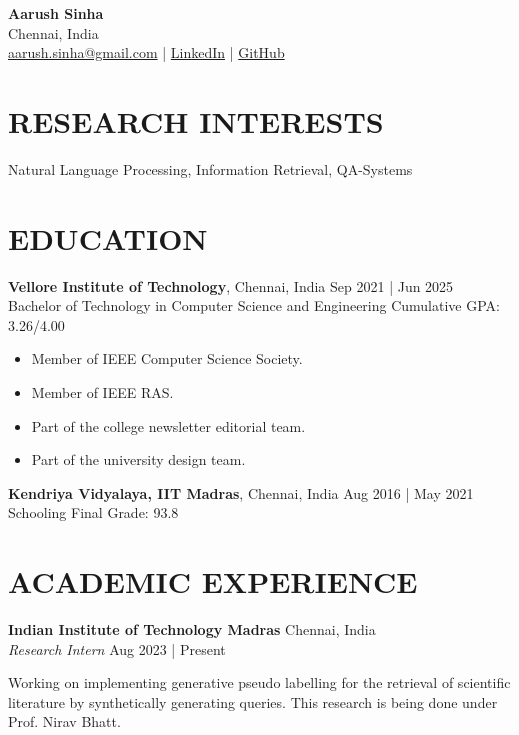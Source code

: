 \documentclass[a4paper,9pt]{extarticle}
\begin{document}
\begin{flushleft}
    \textbf{\LARGE Aarush Sinha}\\[2pt] %
    Chennai, India \\
    \href{mailto:aarush.sinha@gmail.com}{aarush.sinha@gmail.com} | \href{https://www.linkedin.com/in/asj10/}{LinkedIn} | \href{https://github.com/chungimungi}{GitHub} %
\end{flushleft}

\section*{RESEARCH INTERESTS}
\noindent
Natural Language Processing, Information Retrieval, QA-Systems

\section*{EDUCATION}
\noindent
\textbf{Vellore Institute of Technology}, Chennai, India \hfill Sep 2021 | Jun 2025\\ %
Bachelor of Technology in Computer Science and Engineering \hfill Cumulative GPA: 3.26/4.00 \\
\begin{itemize}
    \item Member of IEEE Computer Science Society.
    \item Member of IEEE RAS.
    \item Part of the college newsletter editorial team.
    \item Part of the university design team.
\end{itemize}

\noindent
\textbf{Kendriya Vidyalaya, IIT Madras}, Chennai, India \hfill Aug 2016 | May 2021\\ %
Schooling \hfill Final Grade: 93.8 %

\section*{ACADEMIC EXPERIENCE}
\noindent
\textbf{Indian Institute of Technology Madras} \hfill Chennai, India\\ %
\textit{Research Intern} \hfill Aug 2023 | Present %

Working on implementing generative pseudo labelling for the retrieval of scientific literature by synthetically generating queries. This research is being done under Prof. Nirav Bhatt.
\end{document}
